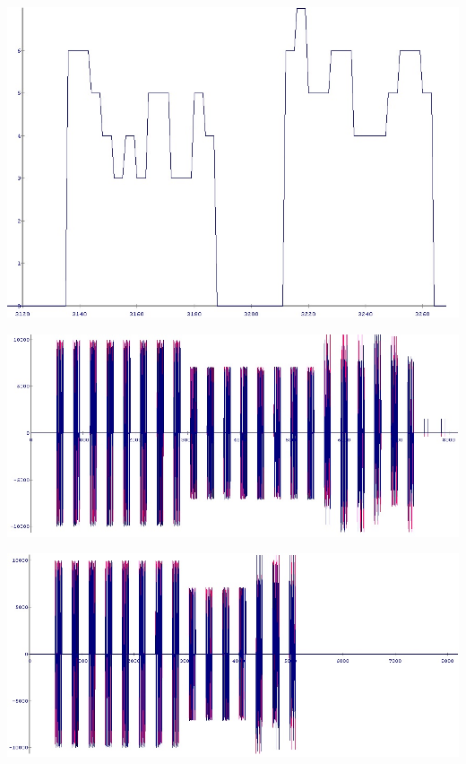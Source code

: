 \begin{center}
\includegraphics[width=\textwidth]{content/fig/h_mag_chipscope_rf_detect.JPG}
\label{h_mag_chipscope_rf_detect}
\end{center}

\begin{center}
\includegraphics[width=\textwidth]{content/fig/OfdmSym_16qam_1_2_code_64byte.JPG}
\label{OfdmSym_16qam_1_2_code_64byte}
\end{center}

\begin{center}
\includegraphics[width=\textwidth]{content/fig/OfdmSym_16qam_no_code_64byte.JPG}
\label{OfdmSym_16qam_no_code_64byte}
\end{center}



